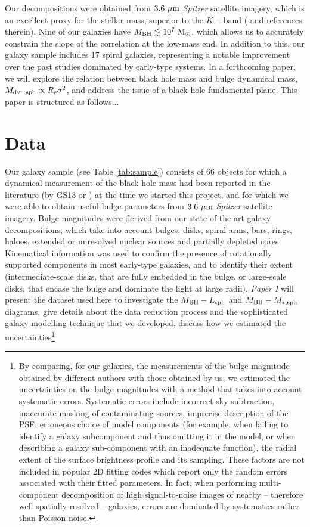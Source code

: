 \documentclass[preprint2]{emulateapj}
\begin{document}
Our decompositions were obtained from $3.6\rm~\mu m$ \emph{Spitzer} satellite imagery, 
which is an excellent proxy for the stellar mass, superior to the $K-$band (\citealt{sheth2010} and references therein).
Nine of our galaxies have $M_{\rm BH} \lesssim 10^7\rm~M_\odot$, 
which allows us to accurately constrain the slope of the correlation at the low-mass end.
In addition to this, our galaxy sample includes 17 spiral galaxies, 
representing a notable improvement over the past studies dominated by early-type systems. 
In a forthcoming paper, we will explore the relation between black hole mass and bulge dynamical mass, 
$M_{\rm dyn,sph} \propto R_{\rm e} \sigma^2$, and address the issue of a black hole fundamental plane.
This paper is structured as follows... 

\section{Data}
\label{sec:data}
Our galaxy sample (see Table \ref{tab:sample}) 
consists of 66 objects for which a dynamical measurement of the black hole mass had been reported in the literature 
(by GS13 or \citealt{rusli2013bhmassesDM}) at the time we started this project, 
and for which we were able to obtain useful bulge parameters from $3.6\rm~\mu m$ \emph{Spitzer} satellite imagery. 
Bulge magnitudes were derived from our state-of-the-art galaxy decompositions, which take into account 
bulges, disks, spiral arms, bars, rings, haloes, extended or unresolved nuclear sources and partially depleted cores.
Kinematical information \citep{atlas3dIII-MNRAS,scott2014,arnold2014} was used 
to confirm the presence of rotationally supported components in most early-type galaxies, 
and to identify their extent 
(intermediate-scale disks, that are fully embedded in the bulge, 
or large-scale disks, that encase the bulge and dominate the light at large radii). 
\emph{Paper I} will present the dataset used here to investigate the $M_{\rm BH} - L_{\rm sph}$ and $M_{\rm BH} - M_{\rm *,sph}$ diagrams, 
give details about the data reduction process and the sophisticated galaxy modelling technique that we developed, 
discuss how we estimated the uncertainties\footnote{By comparing, for our galaxies, the measurements of the bulge magnitude 
obtained by different authors with those obtained by us, we estimated the uncertainties on the bulge magnitudes 
with a method that takes into account systematic errors. 
Systematic errors include incorrect sky subtraction, inaccurate masking of contaminating sources, imprecise description of the PSF, 
erroneous choice of model components (for example, when failing to identify a galaxy subcomponent and thus omitting it in the model, 
or when describing a galaxy sub-component with an inadequate function), 
the radial extent of the surface brightness profile and its sampling. 
These factors are not included in popular 2D fitting codes which report only the random errors associated with their fitted parameters. 
In fact, when performing multi-component decomposition of high signal-to-noise images of nearby -- therefore well spatially resolved -- galaxies, 
errors are dominated by systematics rather than Poisson noise.} 
\end{document}
